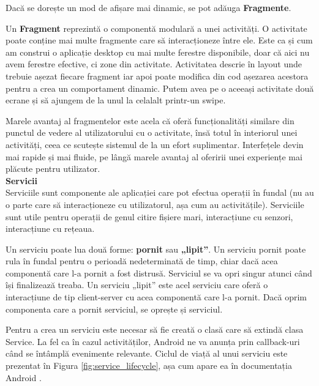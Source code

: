 \documentclass[12pt, a4paper, oneside]{article}
\begin{document}
Dacă se dorește un mod de afișare mai dinamic, se pot adăuga \textbf{Fragmente}.

Un \textbf{Fragment} reprezintă o componentă modulară a unei activități. O activitate poate conține mai multe fragmente care să interacționeze între ele. Este ca și cum am construi o aplicație desktop cu mai multe ferestre disponibile, doar că aici nu avem ferestre efective, ci zone din activitate. Activitatea descrie în layout unde trebuie așezat fiecare fragment iar apoi poate modifica din cod așezarea acestora pentru a crea un comportament dinamic. Putem avea pe o aceeași activitate două ecrane și să ajungem de la unul la celalalt printr-un swipe.

Marele avantaj al fragmentelor este acela că oferă funcționalități similare din punctul de vedere al utilizatorului cu o activitate, însă totul în interiorul unei activități, ceea ce scutește sistemul de la un efort suplimentar. Interfețele devin mai rapide și mai fluide, pe lângă marele avantaj al oferirii unei experiențe mai plăcute pentru utilizator.\\

\textbf{Servicii}\\
Serviciile sunt componente ale aplicației care pot efectua operații în fundal (nu au o parte care să interacționeze cu utilizatorul, așa cum au activitățile). Serviciile sunt utile pentru operații de genul citire fișiere mari, interacțiune cu senzori, interacțiune cu rețeaua.

Un serviciu poate lua două forme: \textbf{pornit} sau \textbf{„lipit”}. Un serviciu pornit poate rula în fundal pentru o perioadă nedeterminată de timp, chiar dacă acea componentă care l-a pornit a fost distrusă. Serviciul se va opri singur atunci când își finalizează treaba. Un serviciu „lipit” este acel serviciu care oferă o interacțiune de tip client-server cu acea componentă care l-a pornit. Dacă oprim componenta care a pornit serviciul, se oprește și serviciul.

Pentru a crea un serviciu este necesar să fie creată o clasă care să extindă clasa Service. La fel ca în cazul activităților, Android ne va anunța prin callback-uri când se întâmplă evenimente relevante. Ciclul de viață al unui serviciu este prezentat în Figura \ref{fig:service_lifecycle}, așa cum apare ea în documentația Android \cite{DeveloperAndroid}.\\
\end{document}
